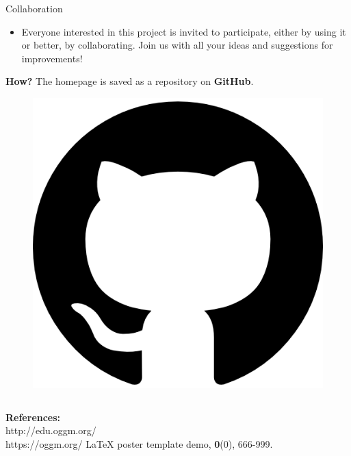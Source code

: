 \documentclass[final]{beamer}
\newcommand*{\smalllogo}[1]{%
	\raisebox{-.3\baselineskip}{%
		\texttt{[image: \#1]}%
	}%
}
\begin{document}
\begin{frame}[fragile]
\begin{columns}
\begin{rightcolumn}
	\begin{boxblock}{Collaboration}
		\begin{minipage}[t]{0.9\textwidth}
				\begin{itemize}	\item[\smalllogo{kopf.png}] Everyone interested in this project is invited to participate, either by using it or better, by collaborating. Join us with all your ideas and suggestions for improvements!
				\end{itemize}
				\textbf{How?} The homepage is saved as a repository on \textbf{GitHub}. 
		\end{minipage}
		\hfill
		\begin{minipage}[t]{0.02\textwidth}
				\begin{figure}
						\includegraphics[width=\textwidth]{github_logo}
				\end{figure}
		\end{minipage}
	\end{boxblock}
\end{rightcolumn}
\end{columns}

\begin{footnotesize}
	
	\vspace{0.3cm}
	\begin{minipage}[t]{0.75\textwidth}
		\textbf{References:} \\
		http://edu.oggm.org/\\
		https://oggm.org/
		LaTeX poster template demo, \textbf{0}(0), 666-999.
		\vspace{0.7cm}
		

\end{minipage}
\end{footnotesize}
\end{frame}
\end{document}
